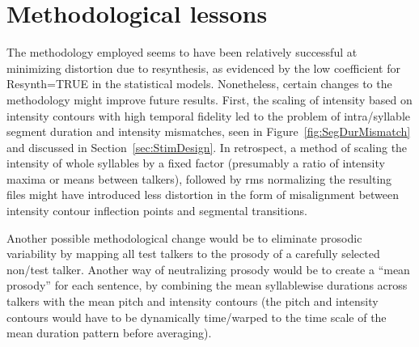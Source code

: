 \section{Methodological lessons}
The methodology employed seems to have been relatively successful at minimizing distortion due to resynthesis, as evidenced by the low coefficient for {\inlinecode Resynth=TRUE} in the statistical models.  Nonetheless, certain changes to the methodology might improve future results.  First, the scaling of intensity based on intensity contours with high temporal fidelity led to the problem of intra\-/syllable segment duration and intensity mismatches, seen in Figure~\ref{fig:SegDurMismatch} and discussed in Section~\ref{sec:StimDesign}.  In retrospect, a method of scaling the intensity of whole syllables by a fixed factor (presumably a ratio of intensity maxima or means between talkers), followed by \ac{rms} normalizing the resulting files might have introduced less distortion in the form of misalignment between intensity contour inflection points and segmental transitions.

Another possible methodological change would be to eliminate prosodic variability by mapping all test talkers to the prosody of a carefully selected non\-/test talker.  Another way of neutralizing prosody would be to create a “mean prosody” for each sentence, by combining the mean syllablewise durations across talkers with the mean pitch and intensity contours (the pitch and intensity contours would have to be dynamically time\-/warped to the time scale of the mean duration pattern before averaging).


